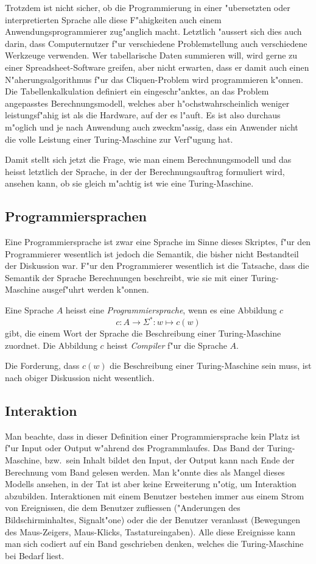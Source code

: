 Trotzdem ist nicht sicher, ob die Programmierung in einer "ubersetzten
oder interpretierten Sprache alle diese F"ahigkeiten auch einem
Anwendungsprogrammierer zug"anglich macht.
Letztlich "aussert sich dies auch darin, dass Computernutzer
f"ur verschiedene Problemstellung auch verschiedene Werkzeuge
verwenden. Wer tabellarische Daten summieren will, wird gerne
zu einer Spreadsheet-Software greifen, aber nicht erwarten, dass er
damit auch einen N"aherungsalgorithmus f"ur das Cliquen-Problem wird
programmieren k"onnen. Die Tabellenkalkulation definiert ein eingeschr"anktes,
an das Problem angepasstes Berechnungsmodell, welches aber
h"ochstwahrscheinlich weniger leistungsf"ahig ist als die Hardware, auf
der es l"auft. Es ist also durchaus m"oglich und je nach Anwendung auch
zweckm"assig, dass ein Anwender nicht die volle Leistung einer
Turing-Maschine zur Verf"ugung hat.

Damit stellt sich jetzt die Frage, wie man einem Berechnungsmodell und
das heisst letztlich der Sprache, in der der Berechnungsauftrag
formuliert wird, ansehen kann, ob sie gleich m"achtig ist wie eine
Turing-Maschine.

\subsection{Programmiersprachen}
Eine Programmiersprache ist zwar eine Sprache im Sinne dieses Skriptes,
f"ur den Programmierer wesentlich ist jedoch die Semantik, die bisher
nicht Bestandteil der Diskussion war. F"ur den Programmierer wesentlich
ist die Tatsache, dass die Semantik der Sprache Berechnungen beschreibt,
wie sie mit einer Turing-Maschine ausgef"uhrt werden k"onnen.

\begin{definition}
Eine Sprache $A$ heisst eine {\em Programmiersprache}, wenn es eine Abbildung $c$
\[
c\colon A\to \Sigma^*\colon w\mapsto c(w)
\]
gibt, die einem Wort der Sprache die Beschreibung einer Turing-Maschine
zuordnet. Die Abbildung $c$ heisst {\em Compiler} f"ur die Sprache $A$.
\end{definition}
Die Forderung, dass $c(w)$ die Beschreibung einer Turing-Maschine
sein muss, ist nach obiger Diskussion nicht wesentlich.

\subsection{Interaktion}
Man beachte, dass in dieser Definition einer Programmiersprache kein Platz ist
f"ur Input oder Output w"ahrend des Programmlaufes.
Das Band der Turing-Maschine, bzw.~sein Inhalt bildet den Input, der Output
kann nach Ende der Berechnung vom Band gelesen werden.
Man k"onnte dies als Mangel dieses Modells ansehen, in der Tat ist aber
keine Erweiterung n"otig, um Interaktion abzubilden.
Interaktionen mit einem Benutzer bestehen immer aus einem Strom von
Ereignissen, die dem Benutzer zufliessen ("Anderungen des Bildschirminhaltes,
Signalt"one) oder die der Benutzer veranlasst (Bewegungen des Maus-Zeigers,
Maus-Klicks, Tastatureingaben). Alle diese Ereignisse kann man sich codiert
auf ein Band geschrieben denken, welches die Turing-Maschine bei Bedarf
liest.

